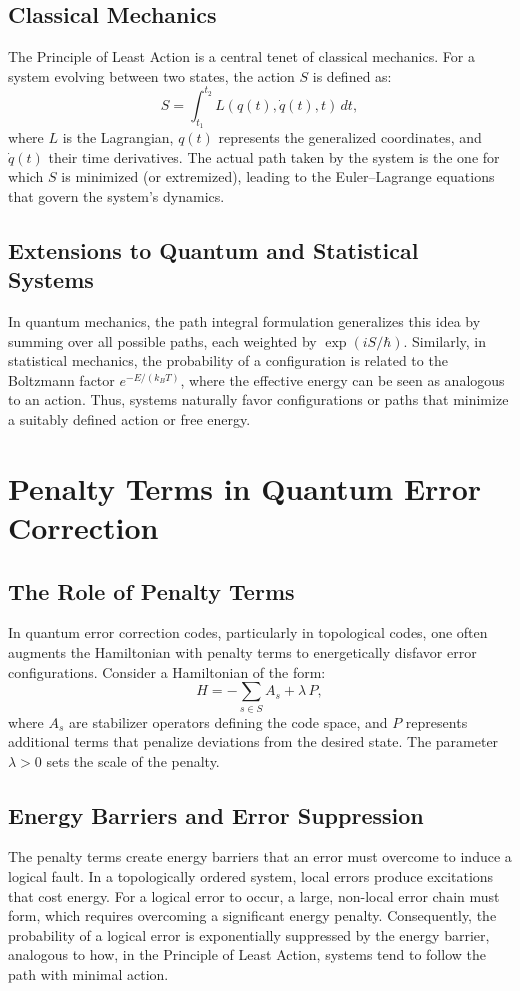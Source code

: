 \documentclass[12pt]{article}
\begin{document}
\subsection{Classical Mechanics}
The Principle of Least Action is a central tenet of classical mechanics. For a system evolving between two states, the action \( S \) is defined as:
\begin{equation}
S = \int_{t_1}^{t_2} L(q(t),\dot{q}(t),t) \, dt,
\end{equation}
where \( L \) is the Lagrangian, \( q(t) \) represents the generalized coordinates, and \( \dot{q}(t) \) their time derivatives. The actual path taken by the system is the one for which \( S \) is minimized (or extremized), leading to the Euler--Lagrange equations that govern the system's dynamics.

\subsection{Extensions to Quantum and Statistical Systems}
In quantum mechanics, the path integral formulation generalizes this idea by summing over all possible paths, each weighted by \( \exp(iS/\hbar) \). Similarly, in statistical mechanics, the probability of a configuration is related to the Boltzmann factor \( e^{-E/(k_B T)} \), where the effective energy can be seen as analogous to an action. Thus, systems naturally favor configurations or paths that minimize a suitably defined action or free energy.

\section{Penalty Terms in Quantum Error Correction}
\subsection{The Role of Penalty Terms}
In quantum error correction codes, particularly in topological codes, one often augments the Hamiltonian with penalty terms to energetically disfavor error configurations. Consider a Hamiltonian of the form:
\begin{equation}
H = -\sum_{s \in S} A_s + \lambda \, P,
\end{equation}
where \( A_s \) are stabilizer operators defining the code space, and \( P \) represents additional terms that penalize deviations from the desired state. The parameter \( \lambda > 0 \) sets the scale of the penalty.

\subsection{Energy Barriers and Error Suppression}
The penalty terms create energy barriers that an error must overcome to induce a logical fault. In a topologically ordered system, local errors produce excitations that cost energy. For a logical error to occur, a large, non-local error chain must form, which requires overcoming a significant energy penalty. Consequently, the probability of a logical error is exponentially suppressed by the energy barrier, analogous to how, in the Principle of Least Action, systems tend to follow the path with minimal action.
\end{document}
